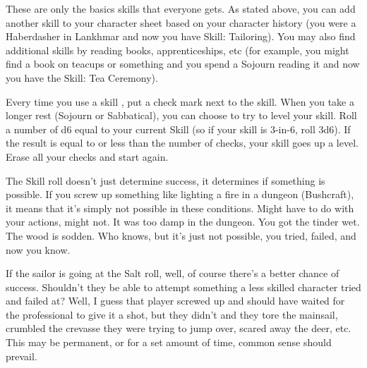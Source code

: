{  These are only the basics skills that everyone gets.  As stated above, you can add another skill to your character sheet based on your character history (you were a Haberdasher in Lankhmar and now you have Skill: Tailoring).  You may also find additional skills by reading books, apprenticeships, etc (for example, you might find a book on teacups or something and you spend a Sojourn reading it and now you have the Skill: Tea Ceremony).
  
  \cbreak

  Every time you use a skill , put a check mark next to the skill. When you take a longer rest (Sojourn or Sabbatical), you can choose to try to level your skill.  Roll a number of d6 equal to your current Skill (so if your skill is 3-in-6, roll 3d6). If the result is equal to or less than the number of checks, your skill goes up a level. Erase all your checks and start again.



  



  The Skill roll doesn't just determine success, it determines if something is possible.  If you screw up something like lighting a fire in a dungeon (Bushcraft), it means that it's simply not possible in these conditions.  Might have to do with your actions, might not. It was too damp in the dungeon. You got the tinder wet.  The wood is sodden. Who knows, but it's just not possible, you tried, failed, and now you know. 

  If the sailor is going at the Salt roll, well, of course there's a better chance of success. Shouldn't they be able to attempt something a less skilled character tried and failed at? Well, I guess that player screwed up and should have waited for the professional to give it a shot, but they didn't and they tore the mainsail, crumbled the crevasse they were trying to jump over, scared away the deer, etc. This may be permanent, or for a set amount of time, common sense should prevail.

}
